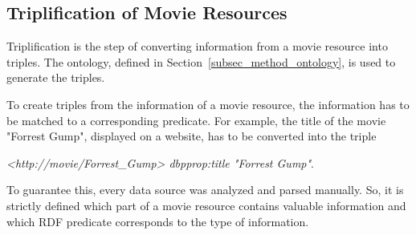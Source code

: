 \subsection{Triplification of Movie Resources}
\label{subsec_method_triplification}

Triplification is the step of converting information from a movie resource into triples.
The ontology, defined in Section~\ref{subsec_method_ontology}, is used to generate the triples.

To create triples from the information of a movie resource, the information has to be matched to a corresponding predicate.
For example, the title of the movie "Forrest Gump", displayed on a website, has to be converted into the triple
\begin{center}\emph{<http://movie/Forrest\_Gump> dbpprop:title "Forrest Gump"}.\end{center}
To guarantee this, every data source was analyzed and parsed manually.
So, it is strictly defined which part of a movie resource contains valuable information and which RDF predicate corresponds to the type of information.